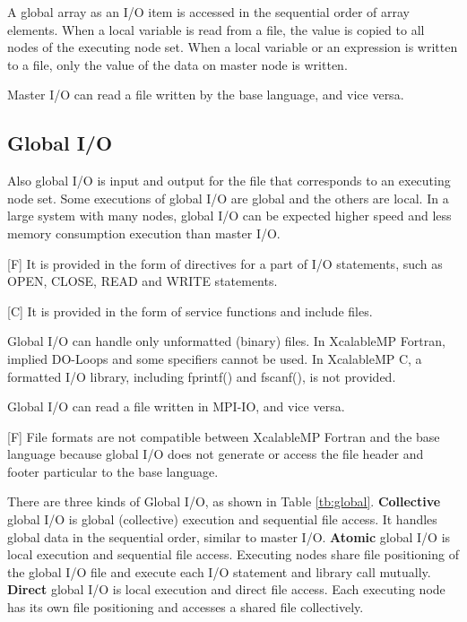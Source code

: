   A global array as an I/O item is accessed in the sequential order of
  array elements.
  When a local variable is read from a file, the value is copied to all
  nodes of the executing node set.
  When a local variable or an expression is written to a file, only the
  value of the data on master node is written.
  
  Master I/O can read a file written by the base language, and vice
  versa.
  

  \subsection{Global I/O}

  Also global I/O is input and output for the file that corresponds to
  an executing node set.
  Some executions of global I/O are global and the others are local.
  In a large system with many nodes, global I/O can be expected higher
  speed and less memory consumption execution than master I/O.

  [F] It is provided in the form of directives for a part of I/O
  statements, such as OPEN, CLOSE, READ
  and WRITE statements.

  [C] It is provided in the form of service functions and include files.

  Global I/O can handle only unformatted (binary) files. In XcalableMP Fortran,
  implied DO-Loops and some specifiers cannot be used.
  In XcalableMP C, a formatted I/O library, including fprintf() and fscanf(), is not provided.

  Global I/O can read a file written in MPI-IO, and vice versa. 

  [F] File formats are not compatible between XcalableMP Fortran
  and the base language because global I/O does not generate or access
  the file header and footer particular to the base language.

  There are three kinds of Global I/O, as shown in Table
  \ref{tb:global}.
  {\bf Collective} global I/O is global (collective) execution and
  sequential file access.
  It handles global data in the sequential order, similar to master
  I/O.
  {\bf Atomic} global I/O is local execution and sequential file access.
  Executing nodes share file positioning of the global I/O file and
  execute each I/O statement and library call mutually.
  {\bf Direct} global I/O is local execution and direct file access.
  Each executing node has its own file positioning and accesses a shared
  file collectively.


